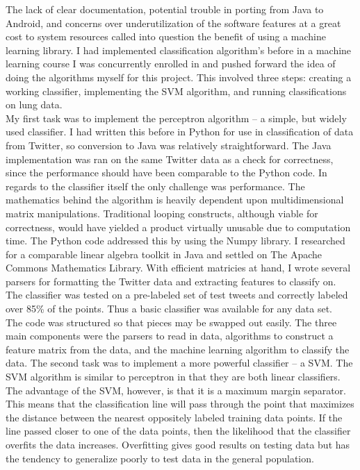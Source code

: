 \documentclass{article}
\begin{document}
The lack of clear documentation, potential trouble in porting from Java to Android, and concerns over underutilization of the software features at a great cost to system resources called into question the benefit of using a machine learning library. I had implemented classification algorithm's before in a machine learning course I was concurrently enrolled in and pushed forward the idea of doing the algorithms myself for this project. This involved three steps: creating a working classifier, implementing the SVM algorithm, and running classifications on lung data.\\

My first task was to implement the perceptron algorithm -- a simple, but widely used classifier. I had written this before in Python for use in classification of data from Twitter, so conversion to Java was relatively straightforward. The Java implementation was ran on the same Twitter data as a check for correctness, since the performance should have been comparable to the Python code. In regards to the classifier itself the only challenge was performance. The mathematics behind the algorithm is heavily dependent upon multidimensional matrix manipulations. Traditional looping constructs, although viable for correctness, would have yielded a product virtually unusable due to computation time. The Python code addressed this by using the Numpy library. I researched for a comparable linear algebra toolkit in Java and settled on The Apache Commons Mathematics Library. With efficient matricies at hand, I wrote several parsers for formatting the Twitter data and extracting features to classify on. The classifier was tested on a pre-labeled set of test tweets and correctly labeled over 85\% of the points. Thus a basic classifier was available for any data set.\\

The code was structured so that pieces may be swapped out easily. The three main components were the parsers to read in data, algorithms to construct a feature matrix from the data, and the machine learning algorithm to classify the data. The second task was to implement a more powerful classifier -- a SVM. The SVM algorithm is similar to perceptron in that they are both linear classifiers. The advantage of the SVM, however, is that it is a maximum margin separator. This means that the classification line will pass through the point that maximizes the distance between the nearest oppositely labeled training data points. If the line passed closer to one of the data points, then the likelihood that the classifier overfits the data increases. Overfitting gives good results on testing data but has the tendency to generalize poorly to test data in the general population. \\
\end{document}
